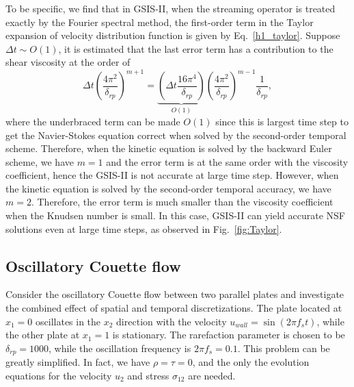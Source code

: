 \documentclass[onefignum,onetabnum]{siamart171218}
\begin{document}
To be specific, we find that in GSIS-II, when the streaming operator is treated exactly by the  Fourier spectral method, the first-order term in the Taylor expansion of velocity distribution function is given by Eq.~\eqref{h1_taylor}.
Suppose $\Delta{t}\sim{O(1)}$, it is estimated that the last error term has a contribution to the shear viscosity at the order of 
\begin{equation}
\Delta{t}\left(\frac{4\pi^2}{\delta_{rp}}\right)^{m+1}
=\underbrace{\left(\Delta{t}\frac{16\pi^4}{\delta_{rp}}\right)}_{O(1)}
\left(\frac{4\pi^2}{\delta_{rp}}\right)^{m-1}
\frac{1}{\delta_{rp}},
\end{equation}
where the underbraced term can be made $O(1)$ since this is largest time step to get the Navier-Stokes equation correct when solved by the second-order temporal scheme.
Therefore, when the kinetic equation is solved by the backward Euler scheme, we have $m=1$ and the error term is at  the same order with the viscosity coefficient, hence the GSIS-II is not accurate at large time step. However, when the kinetic equation is solved by the second-order temporal accuracy, we have $m=2$. Therefore, the error term is much smaller than the viscosity coefficient when the Knudsen number is small. In this case, GSIS-II can yield accurate NSF solutions even at large time steps, as observed in Fig.~\ref{fig:Taylor}.



\subsection{Oscillatory Couette flow}\label{Osci_Couette}

Consider the oscillatory Couette flow between two parallel plates and investigate the combined effect of spatial and temporal discretizations. The plate located at $x_1=0$ oscillates in the $x_2$ direction with the velocity
$u_{wall}=\sin(2\pi{f_s}t)$,
while the other plate at $x_1=1$ is stationary. The rarefaction parameter is chosen to be $\delta_{rp}=1000$, while the oscillation frequency is $2\pi{f_s}=0.1$. This problem can be greatly simplified. In fact, we have $\rho=\tau=0$, and the only the evolution equations for the velocity $u_2$ and stress $\sigma_{12}$ are needed. 
\end{document}
